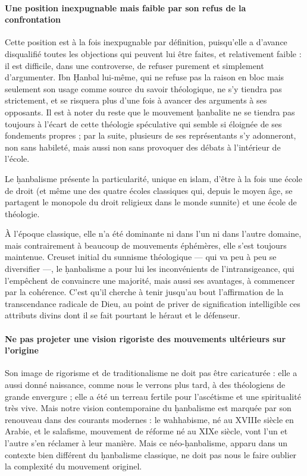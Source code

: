 \paragraph{Une position inexpugnable mais faible par son refus de la confrontation} Cette position est à la fois inexpugnable par définition, puisqu'elle a
d'avance disqualifié toutes les objections qui peuvent lui être faites,
et relativement faible : il est difficile, dans une controverse, de
refuser purement et simplement d'argumenter. Ibn Ḥanbal lui-même, qui ne
refuse pas la raison en bloc mais seulement son usage comme source du
savoir théologique, ne s'y tiendra pas strictement, et se risquera plus
d'une fois à avancer des arguments à ses opposants. Il est à noter du
reste que le mouvement ḥanbalite ne se tiendra pas toujours à l'écart de
cette théologie spéculative qui semble si éloignée de ses fondements
propres ; par la suite, plusieurs de ses représentants s'y adonneront,
non sans habileté, mais aussi non sans provoquer des débats à
l'intérieur de l'école. 

Le ḥanbalisme présente la particularité, unique en islam, d'être à la
fois une école de droit (et même une des quatre écoles classiques qui,
depuis le moyen âge, se partagent le monopole du droit religieux dans le
monde sunnite) et une école de théologie. 

À l'époque classique, elle n'a
été dominante ni dans l'un ni dans l'autre domaine, mais contrairement à
beaucoup de mouvements éphémères, elle s'est toujours maintenue. Creuset
initial du sunnisme théologique --- qui va peu à peu se diversifier ---,
le ḥanbalisme a pour lui les inconvénients de l'intransigeance, qui
l'empêchent de convaincre une majorité, mais aussi ses avantages, à
commencer par la cohérence. C'est qu'il cherche à tenir jusqu'au bout
l'affirmation de la transcendance radicale de Dieu, au point de priver
de signification intelligible ces attributs divins dont il se fait
pourtant le héraut et le défenseur.

\paragraph{Ne pas projeter une vision rigoriste des mouvements ultérieurs sur l'origine} Son image de rigorisme et de traditionalisme ne doit pas être
caricaturée : elle a aussi donné naissance, comme nous le verrons plus
tard, à des théologiens de grande envergure ;
elle a été un terreau fertile pour l'ascétisme et une spiritualité très
vive. Mais notre vision contemporaine du ḥanbalisme est marquée par son
renouveau dans des courants modernes : le wahhabisme, né au XVIIIe
siècle en Arabie, et le salafisme, mouvement de réforme né au XIXe
siècle, vont l'un et l'autre s'en réclamer à leur manière. Mais ce
néo-ḥanbalisme, apparu dans un contexte bien différent du ḥanbalisme
classique, ne doit pas nous le faire oublier la complexité du mouvement
originel.


